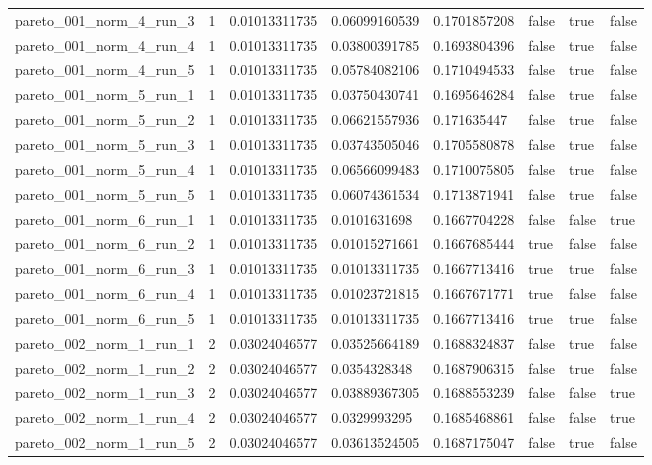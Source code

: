 \begin{tabular}{@{}llllllll@{}}
pareto\_001\_norm\_4\_run\_3 & 1 & 0.01013311735 & 0.06099160539 & 0.1701857208 & false & true & false \\
pareto\_001\_norm\_4\_run\_4 & 1 & 0.01013311735 & 0.03800391785 & 0.1693804396 & false & true & false \\
pareto\_001\_norm\_4\_run\_5 & 1 & 0.01013311735 & 0.05784082106 & 0.1710494533 & false & true & false \\
pareto\_001\_norm\_5\_run\_1 & 1 & 0.01013311735 & 0.03750430741 & 0.1695646284 & false & true & false \\
pareto\_001\_norm\_5\_run\_2 & 1 & 0.01013311735 & 0.06621557936 & 0.171635447 & false & true & false \\
pareto\_001\_norm\_5\_run\_3 & 1 & 0.01013311735 & 0.03743505046 & 0.1705580878 & false & true & false \\
pareto\_001\_norm\_5\_run\_4 & 1 & 0.01013311735 & 0.06566099483 & 0.1710075805 & false & true & false \\
pareto\_001\_norm\_5\_run\_5 & 1 & 0.01013311735 & 0.06074361534 & 0.1713871941 & false & true & false \\
pareto\_001\_norm\_6\_run\_1 & 1 & 0.01013311735 & 0.0101631698 & 0.1667704228 & false & false & true \\
pareto\_001\_norm\_6\_run\_2 & 1 & 0.01013311735 & 0.01015271661 & 0.1667685444 & true & false & false \\
pareto\_001\_norm\_6\_run\_3 & 1 & 0.01013311735 & 0.01013311735 & 0.1667713416 & true & true & false \\
pareto\_001\_norm\_6\_run\_4 & 1 & 0.01013311735 & 0.01023721815 & 0.1667671771 & true & false & false \\
pareto\_001\_norm\_6\_run\_5 & 1 & 0.01013311735 & 0.01013311735 & 0.1667713416 & true & true & false \\
pareto\_002\_norm\_1\_run\_1 & 2 & 0.03024046577 & 0.03525664189 & 0.1688324837 & false & true & false \\
pareto\_002\_norm\_1\_run\_2 & 2 & 0.03024046577 & 0.0354328348 & 0.1687906315 & false & true & false \\
pareto\_002\_norm\_1\_run\_3 & 2 & 0.03024046577 & 0.03889367305 & 0.1688553239 & false & false & true \\
pareto\_002\_norm\_1\_run\_4 & 2 & 0.03024046577 & 0.0329993295 & 0.1685468861 & false & false & true \\
pareto\_002\_norm\_1\_run\_5 & 2 & 0.03024046577 & 0.03613524505 & 0.1687175047 & false & true & false \\

\end{tabular}
